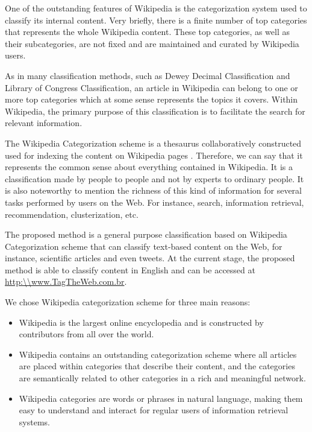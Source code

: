One of the outstanding features of Wikipedia is the categorization system used to classify its internal content. Very briefly, there is a finite number of top categories that represents the whole Wikipedia content. These top categories, as well as their subcategories, are not fixed and are maintained and curated by Wikipedia users. 

As in many classification methods, such as Dewey Decimal Classification\cite{mitchell1996dewey} and Library of Congress Classification\cite{chan2016guide}, an article in Wikipedia can belong to one or more top categories which at some sense represents the topics it covers. Within Wikipedia, the primary purpose of this classification is to facilitate the search for relevant information.


The Wikipedia Categorization scheme is a thesaurus collaboratively constructed used for indexing the content on Wikipedia pages \cite{voss2006collaborative}. Therefore, we can say that it represents the common sense about everything contained in Wikipedia. It is a classification made by people to people and not by experts to ordinary people. It is also noteworthy to mention the richness of this kind of information for several tasks performed by users on the Web. For instance, search, information retrieval, recommendation, clusterization, etc. 

The proposed method is a general purpose classification based on Wikipedia Categorization scheme that can classify text-based content on the Web, for instance, scientific articles and even tweets. At the current stage, the proposed method is able to classify content in English and can be accessed at \url{http:\\www.TagTheWeb.com.br}.


We chose Wikipedia categorization scheme for three main reasons: 

\begin{itemize}
\item  Wikipedia is the largest online encyclopedia and is constructed by contributors from all over the world.
\item Wikipedia contains an outstanding categorization scheme where all articles are placed within categories that describe their content, and the categories are semantically related to other categories in a rich and meaningful network.
\item Wikipedia categories are words or phrases in natural language, making them easy to understand and interact for regular users of information retrieval systems.
\end{itemize}


